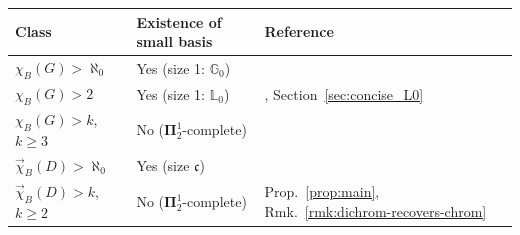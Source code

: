 \medskip
\begin{center}
\begin{tabular}{lll}
	\hline
	\textbf{Class} & \textbf{Existence of small basis} & \textbf{Reference} \\
	\hline
	$\chi_B(G) > \aleph_0$ & Yes (size 1: $\mathbb{G}_0$) & \cite{kechris1999borel} \\
	$\chi_B(G) > 2$ & Yes (size 1: $\mathbb{L}_0$) & \cite{L0paper}, Section~\ref{sec:concise_L0} \\
	$\chi_B(G) > k$, $k\geq 3$ & No ($\mathbf\Pi^1_2$-complete) & \cite{Todorcevic_2021_ComplexProbBorel} \\
	\hline
	$\vec\chi_B(D) > \aleph_0$ & Yes (size $\mathfrak{c}$) & \cite{RaghavanXiao2024} \\
	$\vec\chi_B(D) > k$, $k\geq 2$ & No ($\mathbf\Pi^1_2$-complete) & Prop.~\ref{prop:main}, Rmk.~\ref{rmk:dichrom-recovers-chrom} \\
	\hline
\end{tabular}
\end{center}
